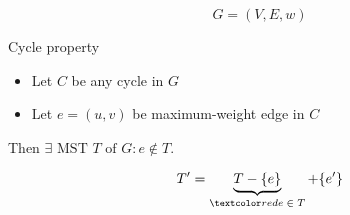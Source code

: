 
\begin{frame}{}
  \centerline{}

  \[
    G = (V, E, w)
  \]
\end{frame}

\begin{frame}{}
  \begin{block}{Cycle property }
    \begin{itemize}
      \item Let $C$ be any cycle in $G$
      \item Let $e = (u,v)$ be  maximum-weight edge in $C$
    \end{itemize}
    Then $\exists \textrm{ MST } T \text{ of } G: e \notin T$.
  \end{block}


  \pause
  \vspace{-0.30cm}
  \[
    T' = \underbrace{T - \set{e}}_{\red{e \;\in\; T}} + \set{e'}
  \]
\end{frame}


